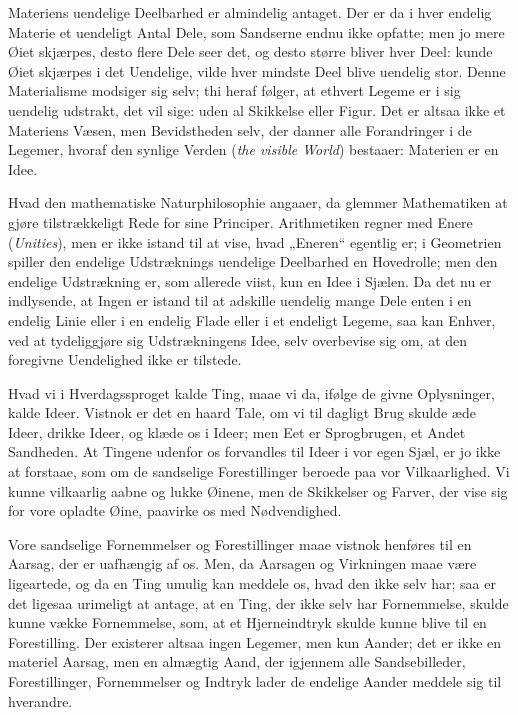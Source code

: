 \documentclass[12pt]{book}
\newcommand{\opage}[1]{\marginnote{\footnotesize\textit{[#1]}}}
\begin{document}
Materiens uendelige Deelbarhed er almindelig antaget. Der er da i hver endelig
Materie et uendeligt Antal Dele, som Sandserne endnu ikke opfatte; men jo mere Øiet
skjærpes, desto flere Dele seer det, og desto større bliver hver Deel: kunde Øiet
skjærpes i det Uendelige, vilde hver mindste Deel blive uendelig stor. Denne
Materialisme modsiger sig selv; thi heraf følger, at ethvert Legeme er i sig
uendelig udstrakt, det vil sige: uden al Skikkelse eller Figur. Det er altsaa ikke
et Materiens Væsen, men Bevidstheden selv, der danner alle Forandringer i de
Legemer, hvoraf den synlige Verden (\textit{the visible World}) bestaaer: Materien
er en Idee.

Hvad den mathematiske Naturphilosophie angaaer, da glemmer Mathematiken at gjøre
tilstrækkeligt Rede for sine Principer. Arithmetiken regner med Enere
(\textit{Unities}), men er ikke istand til at vise, hvad „Eneren“ egentlig er; i
Geometrien spiller den endelige Udstræknings uendelige Deelbarhed en Hovedrolle;
men den endelige Udstrækning er, som allerede viist, kun en Idee i Sjælen. Da det
nu er indlysende, at Ingen er istand til at adskille uendelig mange Dele enten i en
endelig Linie eller i en endelig Flade eller i et endeligt Legeme, saa kan Enhver,
ved at tydeliggjøre sig Udstrækningens Idee, selv overbevise sig om, at den
foregivne Uendelighed ikke er tilstede.

\opage{22} Hvad vi i Hverdagssproget kalde Ting, maae vi da, ifølge de givne Oplysninger,
kalde Ideer. Vistnok er det en haard Tale, om vi til dagligt Brug skulde æde Ideer,
drikke Ideer, og klæde os i Ideer; men Eet er Sprogbrugen, et Andet Sandheden. At
Tingene udenfor os forvandles til Ideer i vor egen Sjæl, er jo ikke at forstaae,
som om de sandselige Forestillinger beroede paa vor Vilkaarlighed. Vi kunne
vilkaarlig aabne og lukke Øinene, men de Skikkelser og Farver, der vise sig for
vore opladte Øine, paavirke os med Nødvendighed.

Vore sandselige Fornemmelser og Forestillinger maae vistnok henføres til en Aarsag,
der er uafhængig af os. Men, da Aarsagen og Virkningen maae være ligeartede, og da
en Ting umulig kan meddele os, hvad den ikke selv har; saa er det ligesaa urimeligt
at antage, at en Ting, der ikke selv har Fornemmelse, skulde kunne vække
Fornemmelse, som, at et Hjerneindtryk skulde kunne blive til en Forestilling. Der
existerer altsaa ingen Legemer, men kun Aander; det er ikke en materiel Aarsag, men
en almægtig Aand, der igjennem alle Sandsebilleder, Forestillinger, Fornemmelser og
Indtryk lader de endelige Aander meddele sig til hverandre.
\end{document}
